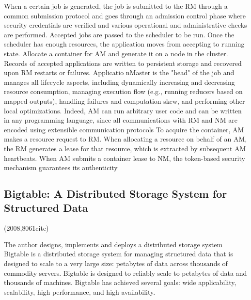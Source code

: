\documentclass[a4paper,twoside]{scrbook}
\begin{document}
\par
When a certain job is generated, the job is submitted to the RM through a common submission protocol and goes through an admission control phase where security credentials are verified and various operational and administrative checks are performed. Accepted jobs are passed to the scheduler to be run. Once the scheduler has enough resources, the application moves from accepting to running state. Allocate a container for AM and generate it on a node in the cluster. Records of accepted applications are written to persistent storage and recovered upon RM restarts or failures.
Applicatio nMaster is the "head" of the job and manages all lifecycle aspects, including dynamically increasing and decreasing resource consumption, managing execution flow (e.g., running reducers based on mapped outputs), handling failures and computation skew, and performing other local optimizations. Indeed, AM can run arbitrary user code and can be written in any programming language, since all communications with RM and NM are encoded using extensible communication protocols
To acquire the container, AM makes a resource request to RM. When allocating a resource on behalf of an AM, the RM generates a lease for that resource, which is extracted by subsequent AM heartbeats. When AM submits a container lease to NM, the token-based security mechanism guarantees its authenticity
\subsection{Bigtable: A Distributed Storage System for Structured Data \cite{chang2008bigtable}}
(2008,8061cite)\par
The author designs, implements and deploys a distributed storage system
Bigtable is a distributed storage system for managing structured data that is designed to scale to a very large size: petabytes of data across thousands of commodity servers.
Bigtable is designed to reliably scale to petabytes of data and thousands of machines. Bigtable has achieved several goals: wide applicability, scalability, high performance, and high availability. 
\par
\end{document}
